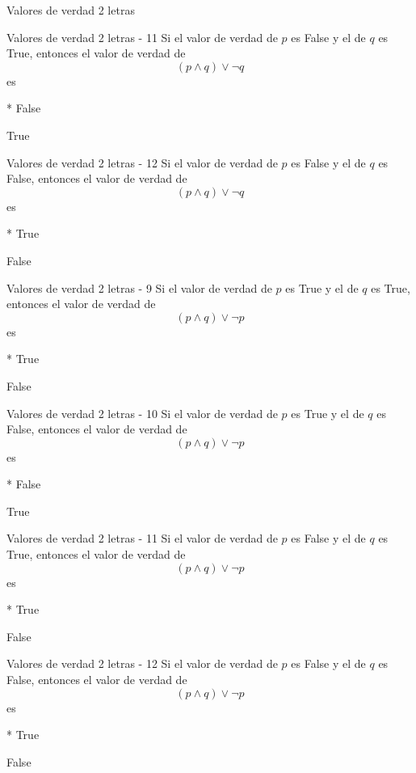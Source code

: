 \documentclass[a4,11pt]{aleph-notas}
\begin{document}
\begin{quiz}{Valores de verdad 2 letras}
\begin{multi}%
    {Valores de verdad 2 letras - 11}
    Si el valor de verdad de $p$ es False y el de $q$ es True, entonces el valor de verdad de 
    \[
        (p \land q) \lor \neg q 
    \]
    es
    \item[]* False
    \item[] True
\end{multi}

\begin{multi}%
    {Valores de verdad 2 letras - 12}
    Si el valor de verdad de $p$ es False y el de $q$ es False, entonces el valor de verdad de 
    \[
        (p \land q) \lor \neg q 
    \]
    es
    \item[]* True
    \item[] False
\end{multi}

\begin{multi}%
    {Valores de verdad 2 letras - 9}
    Si el valor de verdad de $p$ es True y el de $q$ es True, entonces el valor de verdad de 
    \[
        (p \land q) \lor \neg p 
    \]
    es
    \item[]* True
    \item[] False
\end{multi}

\begin{multi}%
    {Valores de verdad 2 letras - 10}
    Si el valor de verdad de $p$ es True y el de $q$ es False, entonces el valor de verdad de 
    \[
        (p \land q) \lor \neg p 
    \]
    es
    \item[]* False
    \item[] True
\end{multi}

\begin{multi}%
    {Valores de verdad 2 letras - 11}
    Si el valor de verdad de $p$ es False y el de $q$ es True, entonces el valor de verdad de 
    \[
        (p \land q) \lor \neg p 
    \]
    es
    \item[]* True
    \item[] False
\end{multi}

\begin{multi}%
    {Valores de verdad 2 letras - 12}
    Si el valor de verdad de $p$ es False y el de $q$ es False, entonces el valor de verdad de 
    \[
        (p \land q) \lor \neg p 
    \]
    es
    \item[]* True
    \item[] False
\end{multi}

\end{quiz}
\end{document}
